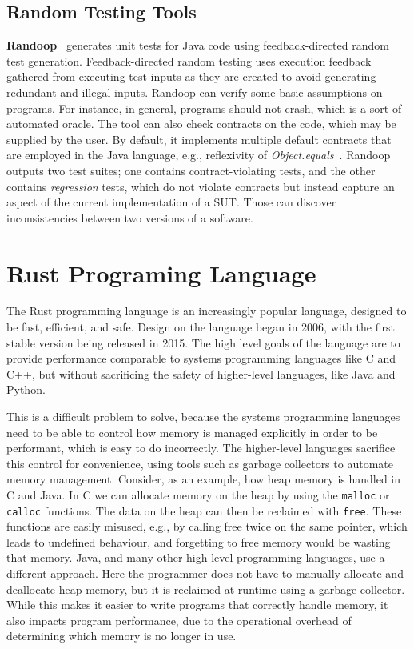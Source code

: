 \documentclass[paper=a4,%
  twoside,%
  BCOR4mm,%
  abstract=true,%
  toc=bibliography,%
  chapterprefix=true,%
  toc=bibliographynumbered,%
  open=right,%
  english,%
  pagesize=pdftex]{scrreprt}
\begin{document}
\section{Random Testing Tools}
\textbf{Randoop}~\cite{Pacheco_2007} generates unit tests for Java code using feedback-directed random test generation. Feedback-directed random testing uses execution feedback gathered from executing test inputs as they are created to avoid generating redundant and illegal inputs. Randoop can verify some basic assumptions on programs. For instance, in general, programs should not crash, which is a sort of automated oracle. The tool can also check  contracts on the code, which may be supplied by the user. By default, it implements multiple default contracts that are employed in the Java language, e.g., reflexivity of \textit{Object.equals}~\cite{Fraser2013}. Randoop outputs two test suites; one contains contract-violating tests, and the other contains \textit{regression} tests, which do not violate contracts but instead capture an aspect of the current implementation of a \ac{SUT}. Those can discover inconsistencies between two versions of a software.


\clearpage
\chapter{Rust Programing Language}
\label{chap:rust-programming-language}
The Rust programming language is an increasingly popular language, designed to be fast, efficient, and safe. Design on the language began in 2006, with the first stable version being released in 2015. The high level goals of the language are to provide performance comparable to systems programming languages like C and C++, but without sacrificing the safety of higher-level languages, like Java and Python.

This is a difficult problem to solve, because the systems programming languages need to be able to control how memory is managed explicitly in order to be performant, which is easy to do incorrectly. The higher-level languages sacrifice this control for convenience, using tools such as garbage collectors to automate memory management.
Consider, as an example, how heap memory is handled in C and Java. In C we can allocate memory on the heap by using the \texttt{malloc} or \texttt{calloc} functions. The data on the heap can then be reclaimed with \texttt{free}. These functions are easily misused, e.g., by calling free twice on the same pointer, which leads to undefined behaviour, and forgetting to free memory would be wasting that memory. Java, and many other high level programming languages, use a different approach. Here the programmer does not have to manually allocate and deallocate heap memory, but it is reclaimed at runtime using a garbage collector. While this makes it easier to write programs that correctly handle memory, it also impacts program performance, due to the operational overhead of determining which memory is no longer in use.
\end{document}
